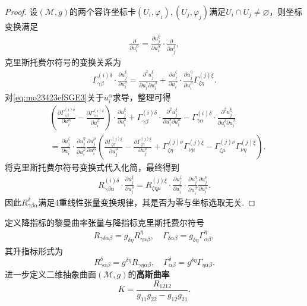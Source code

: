 \documentclass[../../main.tex]{subfiles}%
\begin{document}
\begin{proof}
设$(\mathscr{M},g)$的两个容许坐标卡$(U_i,\varphi_i),(U_j,\varphi_j)$满足$U_i\cap U_j\neq\varnothing $，则坐标变换满足
\begin{align}
\frac{\partial}{\partial u_i^\alpha}=\frac{\partial u_j^\xi}{\partial u_i^\alpha}\cdot\frac{\partial}{\partial u_j^\xi},
\label{eq:mo23423efSGE2}
\end{align}
克里斯托费尔符号的变换关系为
\begin{align}
\Gamma^{(i)\delta}_{\gamma\beta}\cdot\frac{\partial u_j^\xi}{\partial u_i^\delta}=\frac{\partial^2 u_j^\xi}{\partial u_i^\gamma\partial u_i^\beta}+\frac{\partial u_j^\zeta}{\partial u_i^\gamma}\cdot\frac{\partial u_j^\eta}{\partial u_i^\beta}\Gamma^{(j)\xi}_{\zeta\eta}.
\label{eq:mo23423efSGE3}
\end{align}
对\eqref{eq:mo23423efSGE3}关于$u_i^\alpha$求导，整理可得
\begin{align}
&\left( \frac{\partial \Gamma _{\gamma \beta}^{(i)\delta}}{\partial u_{i}^{\alpha}}-\frac{\partial \Gamma _{\gamma \alpha}^{(i)\delta}}{\partial u_{i}^{\beta}} \right) \cdot \frac{\partial u_{j}^{\xi}}{\partial u_{i}^{\delta}}+\Gamma _{\gamma \beta}^{(i)\delta}\cdot \frac{\partial ^2u_{j}^{\xi}}{\partial u_{i}^{\delta}\partial u_{i}^{\alpha}}-\Gamma _{\gamma \alpha}^{(i)\delta}\cdot \frac{\partial ^2u_{j}^{\xi}}{\partial u_{i}^{\delta}\partial u_{i}^{\beta}}
\nonumber \\
&=\frac{\partial u_{j}^{\zeta}}{\partial u_{i}^{\gamma}}\cdot \frac{\partial u_{j}^{\eta}}{\partial u_{i}^{\beta}}\frac{\partial u_{j}^{\mu}}{\partial u_{i}^{\alpha}}\left( \frac{\partial \Gamma _{\zeta \eta}^{(j)\xi}}{\partial u_{j}^{\mu}}-\frac{\partial \Gamma _{\zeta \eta}^{(j)\xi}}{\partial u_{j}^{\nu}}+\Gamma _{\zeta \eta}^{(j)\nu}\Gamma _{\nu \mu}^{(j)\xi}-\Gamma _{\zeta \mu}^{(j)\nu}\Gamma _{\nu \eta}^{(j)\xi} \right) .
\label{eq:mo23423efSGE4}
\end{align}
将克里斯托费尔符号变换式代入化简，最终得到
\begin{align}
R^{(i)\delta}_{\gamma\beta\alpha}\cdot\frac{\partial u_j^\xi}{\partial u_i^\delta}=R^{(j)\xi}_{\zeta\eta\mu}\cdot\frac{\partial u_j^\zeta}{\partial u_i^\gamma}\cdot\frac{\partial u_j^\eta}{\partial u_i^\beta}\frac{\partial u_j^\mu}{\partial u_i^\alpha}.
\label{eq:mo23423efSGE5}
\end{align}
因此$R^\delta_{\gamma\beta\alpha}$满足4重线性张量变换规律，其是否为零与坐标选取无关.
\end{proof}

\begin{definition}
定义降指标的黎曼曲率张量与降指标克里斯托费尔符号
\begin{align}
R_{\gamma\delta\alpha\beta}=g_{\delta\eta}R^\eta_{\gamma\alpha\beta},\quad \Gamma_{\delta\alpha\beta}=g_{\delta\eta}\Gamma^\eta_{\alpha\beta},
\label{eq:mo23423efSGE6}
\end{align}
其升指标形式为
$$R^\delta_{\gamma\alpha\beta}=g^{\delta\eta}R_{\gamma\eta\alpha\beta},\quad \Gamma^\delta_{\alpha\beta}=g^{\delta\eta}\Gamma_{\eta\alpha\beta}.$$
进一步定义二维抽象曲面$(\mathscr{M},g)$的\textbf{高斯曲率}
$$K=\frac{R_{1212}}{g_{11}g_{22}-g_{12}g_{21}}.$$
\end{definition}
\end{document}
